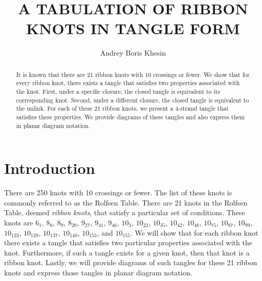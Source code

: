 \documentclass{ws-jktr}
\begin{document}

\title{A TABULATION OF RIBBON KNOTS IN TANGLE FORM}

\author{Andrey Boris Khesin}

\address{University of Toronto\\27 King's College Circle\\Toronto, ON}

\maketitle

\begin{abstract}
It is known that there are 21 ribbon knots with 10 crossings or fewer.
We show that for every ribbon knot, there exists a tangle that satisfies two
properties associated with the knot.
First, under a specific closure, the closed tangle is equivalent to its
corresponding knot.
Second, under a different closure, the closed tangle is equivalent to the
unlink.
For each of these 21 ribbon knots, we present a 4-strand tangle that
satisfies these properties.
We provide diagrams of these tangles and also express them in planar diagram
notation.
\end{abstract}



\section{Introduction}
There are 250 knots with 10 crossings or fewer.
The list of these knots is commonly referred to as the Rolfsen Table.
There are 21 knots in the Rolfsen Table, deemed \textit{ribbon knots}, that
satisfy a particular set of conditions.
These knots are $6_1$, $8_8$, $8_9$, $8_{20}$, $9_{27}$, $9_{41}$, $9_{46}$,
$10_3$, $10_{22}$, $10_{35}$, $10_{42}$, $10_{48}$, $10_{75}$, $10_{87}$,
$10_{99}$, $10_{123}$, $10_{129}$, $10_{137}$, $10_{140}$, $10_{153}$, and
$10_{155}$.
We will show that for each ribbon knot there exists a tangle that satisfies two
particular properties associated with the knot.
Furthermore, if such a tangle exists for a given knot, then that knot is a
ribbon knot.
Lastly, we will provide diagrams of such tangles for these 21 ribbon knots and
express those tangles in planar diagram notation.\\
\end{document}
